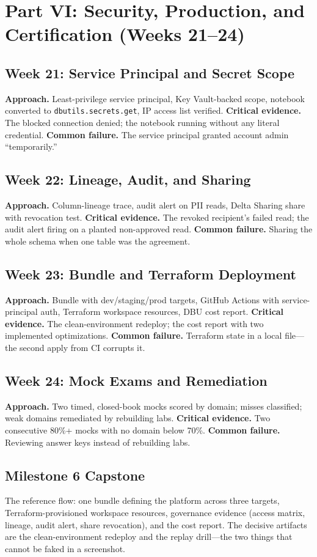 \section{Part VI: Security, Production, and Certification (Weeks 21--24)}
\subsection{Week 21: Service Principal and Secret Scope}
\textbf{Approach.} Least-privilege service principal, Key Vault-backed scope, notebook converted to
\texttt{dbutils.secrets.get}, IP access list verified.
\textbf{Critical evidence.} The blocked connection denied; the notebook running without any literal
credential.
\textbf{Common failure.} The service principal granted account admin ``temporarily.''

\subsection{Week 22: Lineage, Audit, and Sharing}
\textbf{Approach.} Column-lineage trace, audit alert on PII reads, Delta Sharing share with
revocation test.
\textbf{Critical evidence.} The revoked recipient's failed read; the audit alert firing on a
planted non-approved read.
\textbf{Common failure.} Sharing the whole schema when one table was the agreement.

\subsection{Week 23: Bundle and Terraform Deployment}
\textbf{Approach.} Bundle with dev/staging/prod targets, GitHub Actions with service-principal
auth, Terraform workspace resources, DBU cost report.
\textbf{Critical evidence.} The clean-environment redeploy; the cost report with two implemented
optimizations.
\textbf{Common failure.} Terraform state in a local file---the second apply from CI corrupts it.

\subsection{Week 24: Mock Exams and Remediation}
\textbf{Approach.} Two timed, closed-book mocks scored by domain; misses classified; weak domains
remediated by rebuilding labs.
\textbf{Critical evidence.} Two consecutive 80\%+ mocks with no domain below 70\%.
\textbf{Common failure.} Reviewing answer keys instead of rebuilding labs.

\subsection{Milestone 6 Capstone}
The reference flow: one bundle defining the platform across three targets, Terraform-provisioned
workspace resources, governance evidence (access matrix, lineage, audit alert, share revocation),
and the cost report. The decisive artifacts are the clean-environment redeploy and the replay
drill---the two things that cannot be faked in a screenshot.

